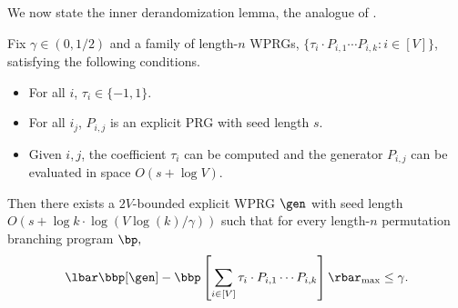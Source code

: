 \documentclass{toc}
\begin{document}
We now state the inner derandomization lemma, the analogue of .
\begin{lemma}\label{lem:cycleInner}
Fix $\gamma\in(0,1/2)$ and a family of length-$n$ WPRGs, %
%
 $\{\tau_i\cdot  P_{i,1}\cdots P_{i,k}:i\in [V]\}$, satisfying the following 
%
conditions.  %
\begin{itemize}
    \item For all $i$, $\tau_i\in \{-1,1\}$.
    \item For all $i_j$, $P_{i,j}$ is an explicit PRG with seed length $s$.
    \item Given $i,j$, the coefficient $\tau_i$ can be computed and the generator $P_{i,j}$ can be evaluated in space $O(s+\log V)$.
\end{itemize}
Then there exists a $2V$-bounded explicit WPRG $\gen$ with seed length $O(s+ \log k\cdot \log(V\log(k)/\gamma))$ such that for every length-$n$ permutation branching program $\bp,$
$$\lbar\bbp[\gen]- \bbp\left[\sum_{i\in[V]}\tau_i \cdot P_{i,1}\cdots P_{i,k}\right]\rbar_{\max} \leq \gamma.$$
\end{lemma}
\end{document}
